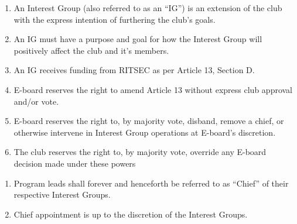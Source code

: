 

\begin{enumerate}
	\item An Interest Group (also referred to as an ``IG'') is an extension of the club
	      with the express intention of furthering the club's goals.
	\item An IG must have a purpose and goal for how the Interest Group will positively
	      affect the club and it's members.
	\item An IG receives funding from RITSEC as per Article 13, Section D.
	\item E-board reserves the right to amend Article 13 without express club approval
	      and/or vote.
	\item E-board reserves the right to, by majority vote, disband, remove a chief, or
	      otherwise intervene in Interest Group operations at E-board's discretion.
	\item The club reserves the right to, by majority vote, override any E-board decision
	      made under these powers
\end{enumerate}


\begin{enumerate}
	\item Program leads shall forever and henceforth be referred to as ``Chief'' of their
	      respective Interest Groups.
	\item Chief appointment is up to the discretion of the Interest Groups.
\end{enumerate}


